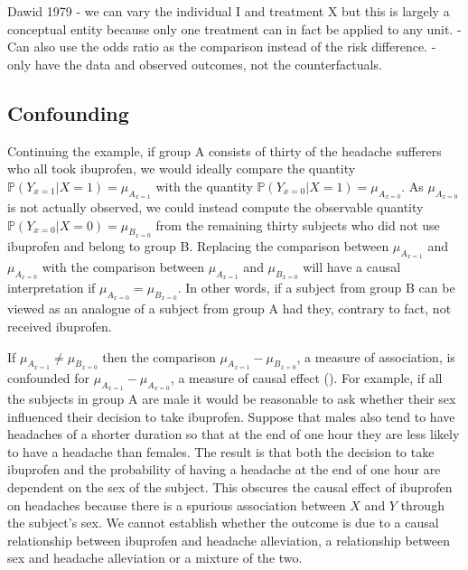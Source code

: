 \documentclass[11pt]{article}
\begin{document}
Dawid 1979 - we can vary the individual I and treatment X but this is
largely a conceptual entity because only one treatment can in fact be
applied to any unit. - Can also use the odds ratio as the comparison
instead of the risk difference. - only have the data and observed
outcomes, not the counterfactuals.

    \subsection{Confounding}\label{confounding}

Continuing the example, if group A consists of thirty of the headache
sufferers who all took ibuprofen, we would ideally compare the quantity
\(\mathbb{P}(Y_{x = 1}|X = 1) = \mu_{A_{x = 1}}\) with the quantity
\(\mathbb{P}(Y_{x = 0}|X = 1) = \mu_{A_{x = 0}}\). As
\(\mu_{A_{x = 0}}\) is not actually observed, we could instead compute
the observable quantity \(\mathbb{P}(Y_{x = 0}|X = 0) = \mu_{B_{x=0}}\)
from the remaining thirty subjects who did not use ibuprofen and belong
to group B. Replacing the comparison between \(\mu_{A_{x = 1}}\) and
\(\mu_{A_{x = 0}}\) with the comparison between \(\mu_{A_{x = 1}}\) and
\(\mu_{B_{x=0}}\) will have a causal interpretation if
\(\mu_{A_{x = 0}} = \mu_{B_{x=0}}\). In other words, if a subject from
group B can be viewed as an analogue of a subject from group A had they,
contrary to fact, not received ibuprofen. \linebreak

If \(\mu_{A_{x = 1}} \neq \mu_{B_{x=0}}\) then the comparison
\(\mu_{A_{x = 1}} - \mu_{B_{x=0}}\), a measure of association, is
confounded for \(\mu_{A_{x = 1}} - \mu_{A_{x = 0}}\), a measure of
causal effect (\citet{Greenland1999}). For example, if all the subjects
in group A are male it would be reasonable to ask whether their sex
influenced their decision to take ibuprofen. Suppose that males also
tend to have headaches of a shorter duration so that at the end of one
hour they are less likely to have a headache than females. The result is
that both the decision to take ibuprofen and the probability of having a
headache at the end of one hour are dependent on the sex of the subject.
This obscures the causal effect of ibuprofen on headaches because there
is a spurious association between \(X\) and \(Y\) through the subject's
sex. We cannot establish whether the outcome is due to a causal
relationship between ibuprofen and headache alleviation, a relationship
between sex and headache alleviation or a mixture of the two. \linebreak
\end{document}
